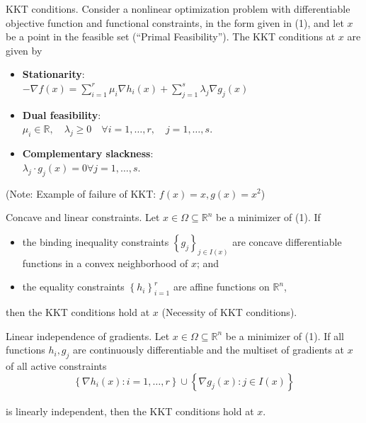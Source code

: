\newpage


\begin{definition}[L7.1]{KKT conditions.}
    Consider a nonlinear optimization problem with differentiable objective function and functional constraints, in the form given in (1), and let $x$ be a point in the feasible set (``Primal Feasibility''). The KKT conditions at $x$ are given by
    \begin{itemize}[leftmargin=*]
        \item \textbf{Stationarity}:\\
        $-\nabla f(x)=\sum_{i=1}^r \mu_i \nabla h_i(x)+\sum_{j=1}^s \lambda_j \nabla g_j(x)$
        \vspace{-2pt}\\
        \item \textbf{Dual feasibility}:\\
        $\mu_i \in \mathbb{R}, \quad \lambda_j \geq 0 \quad \forall i=1, \ldots, r, \quad j=1, \ldots, s .$
        \vspace{-2pt}\\
        \item \textbf{Complementary slackness}:\\
        $\lambda_j \cdot g_j(x) =0 \forall j=1, \ldots, s .$
    \end{itemize}
    (Note: Example of failure of KKT: $f(x) = x, g(x) = x^2$)
\end{definition}



\begin{theorem}[L7.2]{Concave and linear constraints.}
    Let $x \in \Omega \subseteq \mathbb{R}^n$ be a minimizer of (1). If
    \begin{itemize}[leftmargin=*]
        \item the binding inequality constraints $\left\{g_j\right\}_{j \in I(x)}$ are concave differentiable functions in a convex neighborhood of $x$; and
        \item the equality constraints $\left\{h_i\right\}_{i=1}^r$ are affine functions on $\mathbb{R}^n$, 
    \end{itemize}
    then the KKT conditions hold at $x$ (Necessity of KKT conditions).
\end{theorem}


\begin{theorem}[L7.3]{Linear independence of gradients.}
    Let $x \in \Omega \subseteq \mathbb{R}^n$ be a minimizer of (1). If all functions $h_i, g_j$ are continuously differentiable and the multiset of gradients at $x$ of all active constraints
    \vspace{-4pt}\\
    $$
    \left\{\nabla h_i(x): i=1, \ldots, r\right\} \cup\left\{\nabla g_j(x): j \in I(x)\right\}
    $$
    \vspace{-4pt}\\
    is linearly independent, then the KKT conditions hold at $x$.
\end{theorem}

